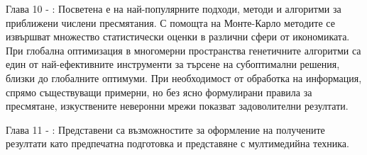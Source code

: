 Глава 10 - : Посветена е на най-популярните подходи, методи и алгоритми за приближени числени пресмятания. С помощта на Монте-Карло методите се извършват множество статистически оценки в различни сфери от икономиката. При глобална оптимизация в многомерни пространства генетичните алгоритми са един от най-ефективните инструменти за търсене на субоптимални решения, близки до глобалните оптимуми. При необходимост от обработка на информация, спрямо съществуващи примерни, но без ясно формулирани правила за пресмятане, изкуствените неверонни мрежи показват задоволителни резултати. 

Глава 11 - : Представени са възможностите за оформление на получените резултати като предпечатна подготовка и представяне с мултимедийна техника. 

